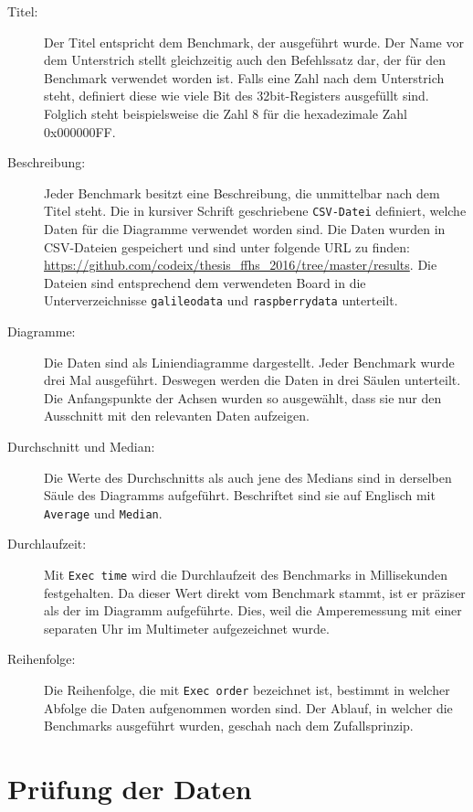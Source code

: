 \begin{description}
\item[Titel:]
Der Titel entspricht dem Benchmark, der ausgeführt wurde. Der Name vor dem Unterstrich stellt gleichzeitig auch den Befehlssatz dar, der für den Benchmark verwendet worden ist. Falls eine Zahl nach dem Unterstrich steht, definiert diese wie viele Bit des 32bit-Registers ausgefüllt sind. Folglich steht beispielsweise die Zahl 8 für die hexadezimale Zahl 0x000000FF.
\item[Beschreibung:]
Jeder Benchmark besitzt eine Beschreibung, die unmittelbar nach dem Titel steht. Die in kursiver Schrift geschriebene \texttt{CSV-Datei} definiert, welche Daten für die Diagramme verwendet worden sind. Die Daten wurden in CSV-Dateien gespeichert und sind unter folgende URL zu finden: \url{https://github.com/codeix/thesis_ffhs_2016/tree/master/results}. Die Dateien sind entsprechend dem verwendeten Board in die Unterverzeichnisse \texttt{galileodata} und \texttt{raspberrydata} unterteilt. 
\item[Diagramme:]
Die Daten sind als Liniendiagramme dargestellt. Jeder Benchmark wurde drei Mal ausgeführt. Deswegen werden die Daten in drei Säulen unterteilt. Die Anfangspunkte der Achsen wurden so ausgewählt, dass sie nur den Ausschnitt mit den relevanten Daten aufzeigen.
\item[Durchschnitt und Median:]
Die Werte des Durchschnitts als auch jene des Medians sind in derselben Säule des Diagramms aufgeführt. Beschriftet sind sie auf Englisch mit \texttt{Average} und \texttt{Median}.
\item[Durchlaufzeit:]
Mit \texttt{Exec time} wird die Durchlaufzeit des Benchmarks in Millisekunden festgehalten. Da dieser Wert direkt vom Benchmark stammt, ist er präziser als der im Diagramm aufgeführte. Dies, weil die Amperemessung mit einer separaten Uhr im Multimeter aufgezeichnet wurde.
\item[Reihenfolge:] Die Reihenfolge, die mit \texttt{Exec order} bezeichnet ist, bestimmt in welcher Abfolge die Daten aufgenommen worden sind. Der Ablauf, in welcher die Benchmarks ausgeführt wurden, geschah nach dem Zufallsprinzip.

\end{description}



\section{Prüfung der Daten}

